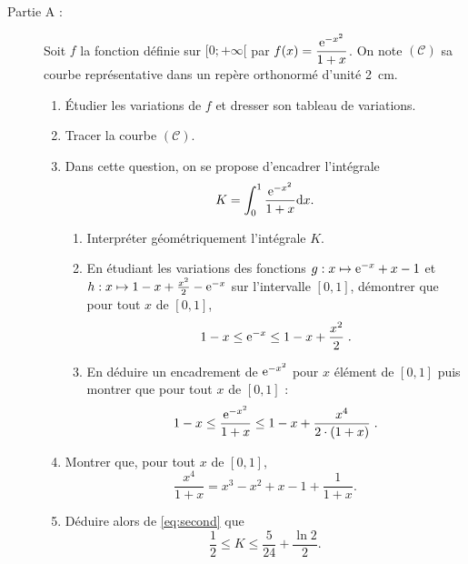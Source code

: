 \begin{exo}
      \begin{description}
      \item[Partie A :]
      Soit $f$ la fonction d\'efinie sur $[0 ; +\infty[$ par
      $\displaystyle f(x) = \frac{\mathrm{e}^{-x^2}}{1+x}$.
      On note $(\mathscr{C})$ sa courbe repr\'esentative dans un rep\`ere
      orthonorm\'e d'unit\'e 2~cm.
      \begin{enumerate}
      \item \'Etudier les variations de $f$ et dresser son tableau de variations.
      \item Tracer la courbe $(\mathscr{C})$.
      \item Dans cette question, on se propose d'encadrer l'int\'egrale
            \[
              K = \int_0^1 \frac{\mathrm{e}^{-x^2}}{1+x} \mathrm{d}x.
            \]
            \begin{enumerate}
            \item Interpr\'eter g\'eom\'etriquement l'int\'egrale $K$.
            \item En \'etudiant les variations des fonctions 
                  $g : x \mapsto \mathrm{e}^{-x} + x - 1$ et 
                  $h : x \mapsto 1 - x + \frac{x^2}{2} - \mathrm{e}^{-x}$
                  sur l'intervalle $[0 , 1]$, d\'emontrer que pour tout $x $ de $[0 , 1]$,
                  \begin{equation} \label{eq:first}
                  1 - x \leq \mathrm{e}^{-x} \leq 1 - x + \frac{x^2}{2} \; .
                  \end{equation}
            \item En d\'eduire un encadrement de $\mathrm{e}^{-x^2}$ pour $x$ \'el\'ement de $[0 , 1]$ 
                  puis montrer que pour tout $x$ de 
                  $[0 , 1]$ : 
                  \begin{equation} \label{eq:second}
                  1-x \leq \frac{\mathrm{e}^{-x^2}}{1 + x} \leq 1 - x + \frac{x^4}{2 \cdot (1 + x)} \; .
                  \end{equation} 
            \end{enumerate}
            \item Montrer que, pour tout $x$ de $[0 , 1]$,
                  \[
                    \frac{x^4}{1 + x} = x^3 - x^2 + x - 1 + \frac{1}{1 + x}.
                  \]
            \item D\'eduire alors de \eqref{eq:second} que
                  \[
                    \frac{1}{2} \leq K \leq \frac{5}{24} + \frac{\ln 2}{2}.
                  \]

\end{enumerate}
\end{description}
\end{exo}
